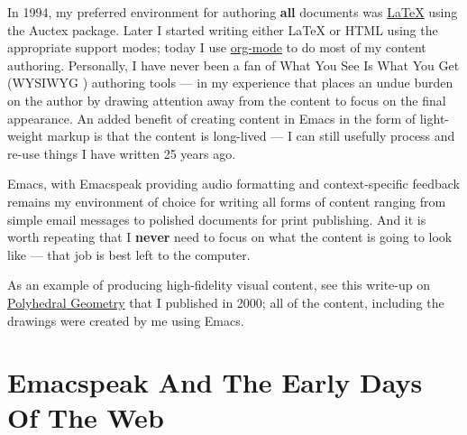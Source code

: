 \documentclass[11pt]{article}
\begin{document}
In 1994, my preferred environment for authoring \textbf{all} documents
was \uline{\LaTeX{}} using the Auctex package. Later I started writing
either \LaTeX{} or HTML using the appropriate support modes; today I
use \uline{org-mode} to do most of my content authoring. Personally, I
have never been a fan of What You See Is What You Get (WYSIWYG )
authoring tools — in my experience that places an undue burden on
the author by drawing attention away from the content to focus on
the final appearance. An added benefit of creating content in
Emacs in the form of light-weight markup is that the content is
long-lived — I can still usefully process and re-use things I
have written 25 years ago.

Emacs, with Emacspeak providing audio formatting and
context-specific feedback remains my environment of choice for
writing all forms of content ranging from simple email messages
to polished documents for print publishing. And it is worth
repeating that I \textbf{never} need to focus on what the content is
going to look like — that job is best left to the computer.

As an example of producing high-fidelity visual content, see this
write-up on
\href{http://emacspeak.sourceforge.net/raman/publications/polyhedra/}{Polyhedral
Geometry} that I published in 2000; all of the content,
including the drawings were created by me using Emacs.

\section{Emacspeak And The Early Days Of The Web}
\label{sec-7}
\end{document}
